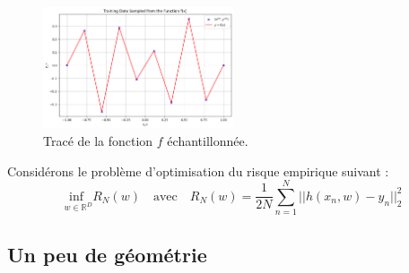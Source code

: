 \documentclass[12pt,a4paper]{article}
\begin{document}
\begin{enumerate}
    \begin{figure}[ht]
        \centering
        \includegraphics[width=0.5\textwidth]{src/trace_f_echantillonne.png}
        \caption{Tracé de la fonction $f$ échantillonnée.}
        \label{fig:trace_f_echantillonne}
    \end{figure}
    

    \end{enumerate}


Considérons le problème d’optimisation du risque empirique suivant :
\begin{equation}
    \underset{w \in \mathbb{R}^D}{\text{inf }} R_N(w) \quad \text{avec} \quad R_N(w) = \frac{1}{2N} \sum_{n=1}^N ||h(x_n, w) - y_n||^2_2
    \label{eq:R_N}
\end{equation}

\newpage

\subsection{Un peu de géométrie}
\end{document}

